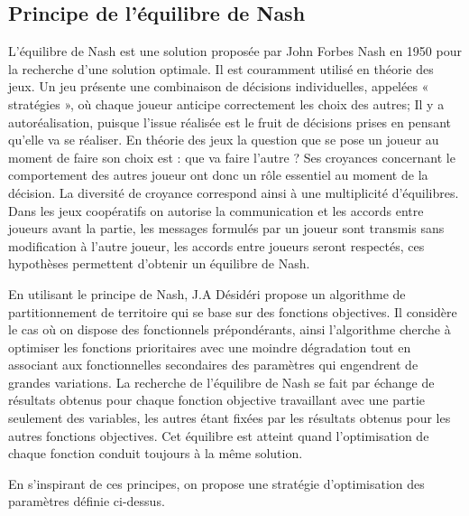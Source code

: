 
 \subsection{Principe de l’\'{e}quilibre de Nash}
 
L'\'{e}quilibre de Nash est une solution propos\'{e}e par John Forbes Nash en 1950 \citep{depriester1950johnnash} pour la recherche d’une solution optimale. Il est couramment utilis\'{e} en th\'{e}orie des jeux. Un jeu pr\'{e}sente une combinaison de d\'{e}cisions individuelles, appel\'{e}es « strat\'{e}gies », où chaque joueur anticipe correctement les choix des autres; Il y a autor\'{e}alisation, puisque l'issue r\'{e}alis\'{e}e est le fruit de d\'{e}cisions prises en pensant qu'elle va se r\'{e}aliser. En th\'{e}orie des jeux la question que se pose un joueur au moment de faire son choix est : que va faire l'autre ? Ses croyances concernant le comportement des autres joueur ont donc un rôle essentiel au moment de la d\'{e}cision. La diversit\'{e} de croyance correspond ainsi \`{a} une multiplicit\'{e} d'\'{e}quilibres. Dans les jeux coop\'{e}ratifs on autorise la communication et les accords entre joueurs avant la partie, les messages formul\'{e}s par un joueur sont transmis sans modification \`{a} l'autre joueur, les accords entre joueurs seront respect\'{e}s, ces hypoth\`{e}ses permettent d'obtenir un \'{e}quilibre de Nash.

En utilisant le principe de Nash, J.A D\'{e}sid\'{e}ri \citep{depriester2007jeanantoine} propose un algorithme de partitionnement de territoire qui se base sur des fonctions objectives. Il consid\`{e}re le cas où on dispose des fonctionnels pr\'{e}pond\'{e}rants, ainsi l'algorithme cherche \`{a} optimiser les fonctions prioritaires avec une moindre d\'{e}gradation tout en associant aux fonctionnelles secondaires des param\`{e}tres qui engendrent de grandes variations. La recherche de l’\'{e}quilibre de Nash se fait par \'{e}change de r\'{e}sultats obtenus pour chaque fonction objective travaillant avec une partie seulement des variables, les autres \'{e}tant fix\'{e}es par les r\'{e}sultats obtenus pour les autres fonctions objectives. Cet \'{e}quilibre est atteint quand l’optimisation de chaque fonction conduit toujours \`{a} la m\^{e}me solution.

En s'inspirant de ces principes, on propose une strat\'{e}gie d'optimisation des param\`{e}tres définie ci-dessus.
